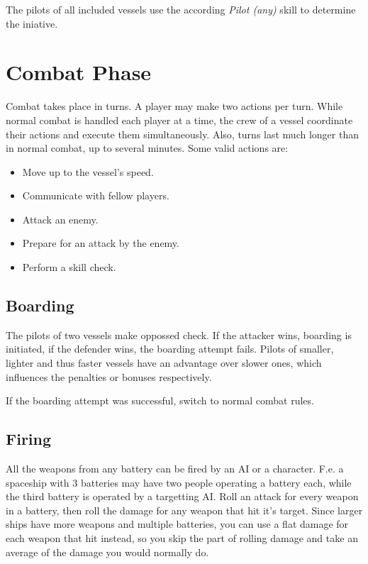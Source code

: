 The pilots of all included vessels use the according \emph{Pilot (any)} skill to determine the iniative.

\section{Combat Phase}
\label{sec:Vessels-Combat-Combat-Phase}

Combat takes place in turns. A player may make two actions per turn. While normal combat is handled each player at a time, the crew of a vessel coordinate their actions and execute them simultaneously. Also, turns last much longer than in normal combat, up to several minutes. Some valid actions are:

\begin{itemize}
  \item Move up to the vessel's speed.
  \item Communicate with fellow players.
  \item Attack an enemy.
  \item Prepare for an attack by the enemy.
  \item Perform a skill check.
\end{itemize}

\subsection{Boarding}
\label{sub:Vessels-Combat-Combat-Phase-Boarding}

The pilots of two vessels make oppossed check. If the attacker wins, boarding is initiated, if the defender wins, the boarding attempt fails. Pilots of smaller, lighter and thus faster vessels have an advantage over slower ones, which influences the penalties or bonuses respectively.

If the boarding attempt was successful, switch to normal combat rules.

\subsection{Firing}
\label{sub:Vessels-Combat-Combat-Phase-Firing}

All the weapons from any battery can be fired by an AI or a character. F.e. a spaceship with 3 batteries may have two people operating a battery each, while the third battery is operated by a targetting AI. Roll an attack for every weapon in a battery, then roll the damage for any weapon that hit it's target. Since larger ships have more weapons and multiple batteries, you can use a flat damage for each weapon that hit instead, so you skip the part of rolling damage and take an average of the damage you would normally do.

